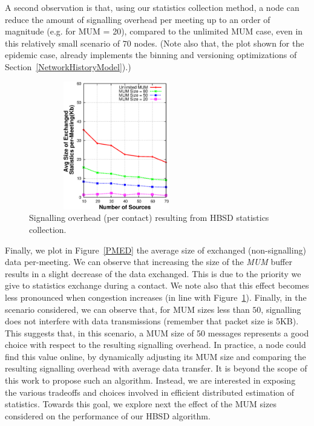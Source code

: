 A second observation is that, using our statistics collection method, a node can reduce the amount of signalling overhead per meeting up to an order of magnitude (e.g. for MUM = 20), compared to the unlimited MUM case, even in this relatively small scenario of $70$ nodes. (Note also that, the plot shown for the epidemic case, already implements the binning and versioning optimizations of Section~\ref{NetworkHistoryModel}).)

\begin{figure}[!h]
\centering
\includegraphics[width=3in,height=2.2in]{Chapitre3/fig7.eps}
\caption{Signalling overhead (per contact) resulting from HBSD statistics collection.}
\label{StatOverhead}
\end{figure}

Finally, we plot in Figure~\ref{PMED} the average size of exchanged (non-signalling) data per-meeting. We can observe that increasing the size of the \emph{MUM} buffer results in a slight decrease of the data exchanged. This is due to the priority we give to statistics exchange during a contact. We note also that this effect becomes less pronounced when congestion increases (in line with Figure~\ref{StatOverhead}). Finally, in the scenario considered, we can observe that, for MUM sizes less than $50$, signalling does not interfere with data transmissions (remember that packet size is 5KB). This suggests that, in this scenario, a MUM size of 50 messages represents a good choice with respect to the resulting signalling overhead. In practice, a node could find this value online, by dynamically adjusting its MUM size and comparing the resulting signalling overhead with average data transfer. It is beyond the scope of this work to propose such an algorithm. Instead, we are interested in exposing the various tradeoffs and choices involved in efficient distributed estimation of statistics. Towards this goal, we explore next the effect of the MUM sizes considered on the performance of our HBSD algorithm.



